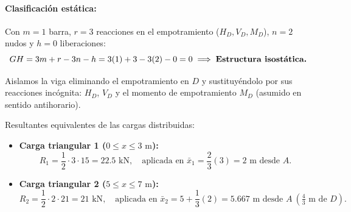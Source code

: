\paragraph{Clasificación estática:}
Con $m = 1$ barra, $r = 3$ reacciones en el empotramiento ($H_D, V_D, M_D$), $n = 2$ nudos y $h = 0$ liberaciones:
\begin{equation}
    GH = 3m + r - 3n - h = 3(1) + 3 - 3(2) - 0 = 0 \implies \text{\textbf{Estructura isostática.}}
\end{equation}


Aislamos la viga eliminando el empotramiento en $D$ y sustituyéndolo por sus reacciones incógnita: $H_D$, $V_D$ y el momento de empotramiento $M_D$ (asumido en sentido antihorario).

Resultantes equivalentes de las cargas distribuidas:
\begin{itemize}
    \item \textbf{Carga triangular 1 ($0 \le x \le 3\text{ m}$):}
          \begin{equation}
              R_1 = \frac{1}{2} \cdot 3 \cdot 15 = 22.5\text{ kN}, \quad \text{aplicada en } \bar{x}_1 = \frac{2}{3}(3) = 2\text{ m desde } A.
          \end{equation}
    \item \textbf{Carga triangular 2 ($5 \le x \le 7\text{ m}$):}
          \begin{equation}
              R_2 = \frac{1}{2} \cdot 2 \cdot 21 = 21\text{ kN}, \quad \text{aplicada en } \bar{x}_2 = 5 + \frac{1}{3}(2) = 5.667\text{ m desde } A \ \left(\tfrac{4}{3}\text{ m de } D\right).
          \end{equation}
\end{itemize}


